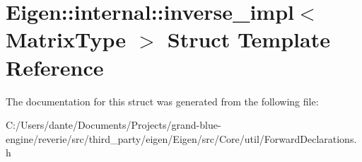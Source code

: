 \hypertarget{struct_eigen_1_1internal_1_1inverse__impl}{}\section{Eigen\+::internal\+::inverse\+\_\+impl$<$ Matrix\+Type $>$ Struct Template Reference}
\label{struct_eigen_1_1internal_1_1inverse__impl}


The documentation for this struct was generated from the following file\+:\begin{DoxyCompactItemize}
\item 
C\+:/\+Users/dante/\+Documents/\+Projects/grand-\/blue-\/engine/reverie/src/third\+\_\+party/eigen/\+Eigen/src/\+Core/util/Forward\+Declarations.\+h\end{DoxyCompactItemize}
